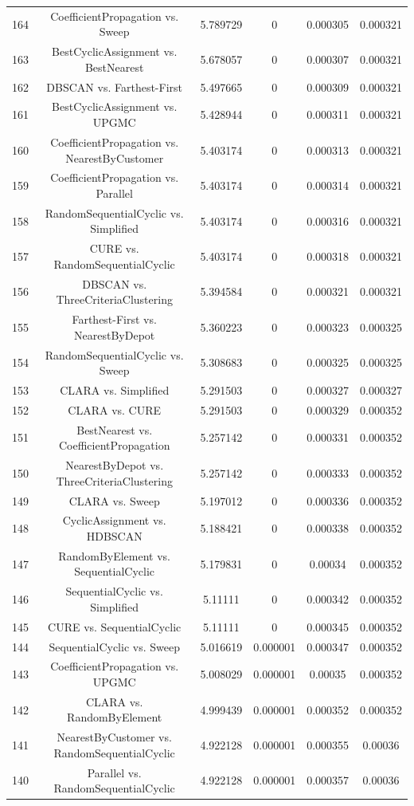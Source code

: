 \documentclass[a4paper,10pt]{article}
\begin{document}
\begin{landscape}
\begin{table}[!htp]
\begin{tabular}{cccccc}
164&CoefficientPropagation vs. Sweep&5.789729&0&0.000305&0.000321\\
163&BestCyclicAssignment vs. BestNearest&5.678057&0&0.000307&0.000321\\
162&DBSCAN vs. Farthest-First&5.497665&0&0.000309&0.000321\\
161&BestCyclicAssignment vs. UPGMC&5.428944&0&0.000311&0.000321\\
160&CoefficientPropagation vs. NearestByCustomer&5.403174&0&0.000313&0.000321\\
159&CoefficientPropagation vs. Parallel&5.403174&0&0.000314&0.000321\\
158&RandomSequentialCyclic vs. Simplified&5.403174&0&0.000316&0.000321\\
157&CURE vs. RandomSequentialCyclic&5.403174&0&0.000318&0.000321\\
156&DBSCAN vs. ThreeCriteriaClustering&5.394584&0&0.000321&0.000321\\
155&Farthest-First vs. NearestByDepot&5.360223&0&0.000323&0.000325\\
154&RandomSequentialCyclic vs. Sweep&5.308683&0&0.000325&0.000325\\
153&CLARA vs. Simplified&5.291503&0&0.000327&0.000327\\
152&CLARA vs. CURE&5.291503&0&0.000329&0.000352\\
151&BestNearest vs. CoefficientPropagation&5.257142&0&0.000331&0.000352\\
150&NearestByDepot vs. ThreeCriteriaClustering&5.257142&0&0.000333&0.000352\\
149&CLARA vs. Sweep&5.197012&0&0.000336&0.000352\\
148&CyclicAssignment vs. HDBSCAN&5.188421&0&0.000338&0.000352\\
147&RandomByElement vs. SequentialCyclic&5.179831&0&0.00034&0.000352\\
146&SequentialCyclic vs. Simplified&5.11111&0&0.000342&0.000352\\
145&CURE vs. SequentialCyclic&5.11111&0&0.000345&0.000352\\
144&SequentialCyclic vs. Sweep&5.016619&0.000001&0.000347&0.000352\\
143&CoefficientPropagation vs. UPGMC&5.008029&0.000001&0.00035&0.000352\\
142&CLARA vs. RandomByElement&4.999439&0.000001&0.000352&0.000352\\
141&NearestByCustomer vs. RandomSequentialCyclic&4.922128&0.000001&0.000355&0.00036\\
140&Parallel vs. RandomSequentialCyclic&4.922128&0.000001&0.000357&0.00036\\

\end{tabular}
\end{table}
\end{landscape}
\end{document}

